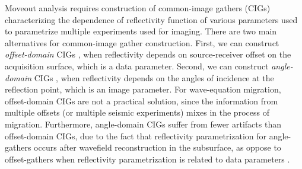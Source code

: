 Moveout analysis requires construction of common-image gathers (CIGs)
characterizing the dependence of reflectivity function of various
parameters used to parametrize multiple experiments used for
imaging. There are two main alternatives for common-image gather
construction. First, we can construct \textit{offset-domain} CIGs
\cite[]{GEO49-10-16641674}, when reflectivity depends on
source-receiver offset on the acquisition surface, which is a data
parameter. Second, we can construct \textit{angle-domain} CIGs
\cite[]{GEO55-09-12231234, SEG-1999-08240827, SEG-2000-08300833,
GEO67-03-08830889, XieWu.adcig, GEO68-03-10651074, SEG-2003-08890892,
Fomel.seg.3dadcig, GEO69-05-12831298}, when reflectivity depends on
the angles of incidence at the reflection point, which is an image
parameter. For wave-equation migration, offset-domain CIGs are not a
practical solution, since the information from multiple offsets (or
multiple seismic experiments) mixes in the process of
migration. Furthermore, angle-domain CIGs suffer from fewer artifacts
than offset-domain CIGs, due to the fact that reflectivity
parametrization for angle-gathers occurs after wavefield
reconstruction in the subsurface, as oppose to offset-gathers when
reflectivity parametrization is related to data parameters
\cite[]{GEO69-02-05620575}.


